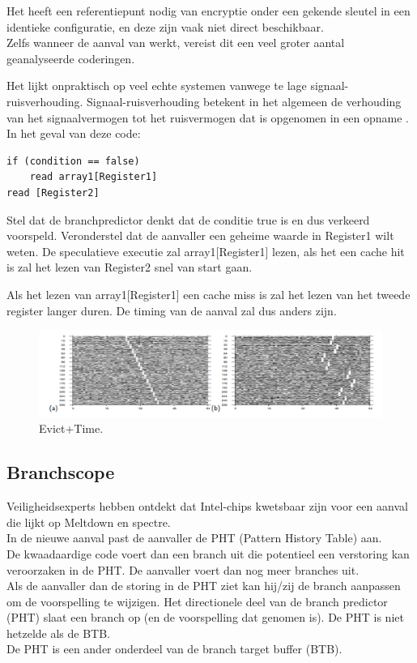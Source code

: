 Het heeft een referentiepunt nodig van encryptie onder een gekende sleutel in een identieke configuratie, en deze zijn vaak niet direct beschikbaar.\\
Zelfs wanneer de aanval van \parencite{Bernstein2005} werkt, vereist dit
een veel groter aantal geanalyseerde coderingen.

Het lijkt onpraktisch op veel echte systemen vanwege te lage signaal-ruisverhouding.
Signaal-ruisverhouding betekent in het algemeen de verhouding van het signaalvermogen tot het ruisvermogen dat is opgenomen in een opname \parencite{Johnson2006}.\\

In het geval van deze code:
\begin{lstlisting}
if (condition == false)
	read array1[Register1]
read [Register2]
\end{lstlisting}
Stel dat de branchpredictor denkt dat de conditie true is en dus verkeerd voorspeld.
Veronderstel dat de aanvaller een geheime waarde in Register1 wilt weten.
De speculatieve executie zal array1[Register1] lezen, als het een cache hit is zal het lezen van Register2 snel van start gaan.


Als het lezen van array1[Register1] een cache miss is zal het lezen van het tweede register langer duren.
De timing van de aanval zal dus anders zijn.

\begin{figure}
	\includegraphics[width=1.0\linewidth]{img/evicttime.png}
	\caption{Evict+Time.}
	\label{fig:evicttime}
\end{figure}


\subsection{Branchscope}
Veiligheidsexperts hebben ontdekt dat Intel-chips kwetsbaar zijn voor een aanval die lijkt op Meltdown en spectre.\\
In de nieuwe aanval past de aanvaller de PHT (Pattern History Table) aan.\\
De kwaadaardige code voert dan een branch uit die potentieel een verstoring kan veroorzaken in de PHT.
De aanvaller voert dan nog meer branches uit.\\
Als de aanvaller dan de storing in de PHT ziet kan hij/zij de branch aanpassen om de voorspelling te wijzigen.
Het directionele deel van de branch predictor (PHT) slaat een branch op (en de voorspelling dat genomen is).
De PHT is niet hetzelde als de BTB.\\
De PHT is een ander onderdeel van de branch target buffer (BTB).


